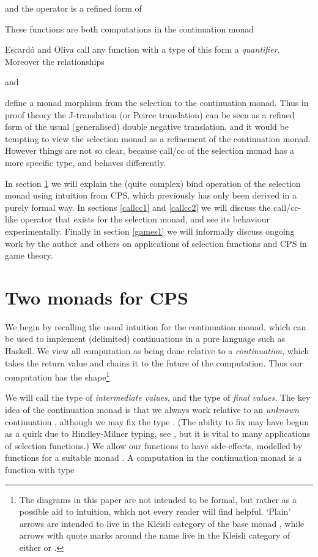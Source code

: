 \documentclass{article}
\begin{document}
and the operator  is a refined form of

These functions are both computations in the continuation monad

Escard\'o and Oliva call any function with a type of this form a \emph{quantifier}. Moreover the relationships

and

define a monad morphism from the selection to the continuation monad. Thus in proof theory the J-translation (or Peirce translation) \citep{escardo12b} can be seen as a refined form of the usual (generalised) double negative translation, and it would be tempting to view the selection monad as a refinement of the continuation monad. However things are not so clear, because call/cc of the selection monad has a more specific type, and behaves differently.

In section \ref{monads} we will explain the (quite complex) bind operation of the selection monad using intuition from CPS, which previously has only been derived in a purely formal way. In sections \ref{callcc1} and \ref{callcc2} we will discuss the call/cc-like operator that exists for the selection monad, and see its behaviour experimentally. Finally in section \ref{games1} we will informally discuss ongoing work by the author and others on applications of selection functions and CPS in game theory. 

\section{Two monads for CPS}\label{monads}


We begin by recalling the usual intuition for the continuation monad, which can be used to implement (delimited) continuations in a pure language such as Haskell. We view all computation as being done relative to a \emph{continuation}, which takes the return value and chains it to the future of the computation. Thus our computation has the shape\footnote{The diagrams in this paper are not intended to be formal, but rather as a possible aid to intuition, which not every reader will find helpful. `Plain' arrows are intended to live in the Kleisli category of the base monad , while arrows with quote marks around the name live in the Kleisli category of either  or .}
\begin{center}\end{center}
We will call  the type of \emph{intermediate values}, and  the type of \emph{final values}. The key idea of the continuation monad is that we always work relative to an \emph{unknown} continuation , although we may fix the type . (The ability to fix  may have begun as a quirk due to Hindley-Milner typing, see \citep{kiselyov}, but it is vital to many applications of selection functions.) We allow our functions to have side-effects, modelled by functions  for a suitable monad . A computation in the continuation monad is a function with type
\end{document}
